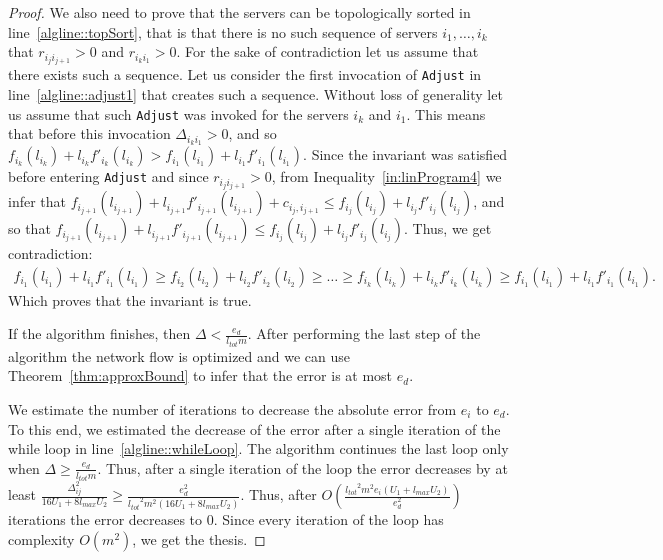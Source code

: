\documentclass[11pt]{article}
\newcommand{\ltot}{{{l_{\mathit{tot}}}}}
\newcommand{\lmax}{{{l_{\mathit{max}}}}}
\begin{document}
\begin{proof}
We also need to prove that the servers can be topologically sorted in line~\ref{algline::topSort}, that is that there is no such sequence of servers $i_1, \dots, i_k$ that $r_{i_{j}i_{j+1}} > 0$ and $r_{i_{k}i_{1}} > 0$. For the sake of contradiction let us assume that there exists such a sequence. Let us consider the first invocation of \texttt{Adjust} in line~\ref{algline::adjust1} that creates such a sequence. Without loss of generality let us assume that such \texttt{Adjust} was invoked for the servers $i_k$ and $i_1$. This means that before this invocation $\Delta_{i_ki_1} > 0$, and so
$f_{{i_k}}(l_{i_k}) + l_{i_k}f'_{{i_k}}(l_{i_k}) > f_{{i_1}}(l_{i_1}) + l_{i_1}f'_{{i_1}}(l_{i_1})$.
Since the invariant was satisfied before entering \texttt{Adjust} and since $r_{i_{j}i_{j+1}} > 0$, from Inequality~\ref{in:linProgram4} we infer that
$f_{{i_{j+1}}}(l_{i_{j+1}}) + l_{i_{j+1}}f'_{{i_{j+1}}}(l_{i_{j+1}}) + c_{i_{j},i_{j+1}} \leq f_{{i_{j}}}(l_{i_{j}}) + l_{i_{j}}f'_{{i_{j}}}(l_{i_{j}})$, and so that
$f_{{i_{j+1}}}(l_{i_{j+1}}) + l_{i_{j+1}}f'_{{i_{j+1}}}(l_{i_{j+1}}) \leq f_{{i_{j}}}(l_{i_{j}}) + l_{i_{j}}f'_{{i_{j}}}(l_{i_{j}})$. Thus, we get contradiction:
\begin{align*}
f_{{i_{1}}}(l_{i_{1}}) + l_{i_{1}}f'_{{i_{1}}}(l_{i_{1}}) \geq
f_{{i_{2}}}(l_{i_{2}}) + l_{i_{2}}f'_{{i_{2}}}(l_{i_{2}}) \geq
\dots \geq
f_{{i_{k}}}(l_{i_{k}}) + l_{i_{k}}f'_{{i_{k}}}(l_{i_{k}}) \geq
f_{{i_{1}}}(l_{i_{1}}) + l_{i_{1}}f'_{{i_{1}}}(l_{i_{1}}) \textrm{.}
\end{align*}
Which proves that the invariant is true.

If the algorithm finishes, then $\Delta < \frac{e_d}{\ltot m}$. After performing the last step of the algorithm the network flow is optimized and we can use Theorem~\ref{thm:approxBound} to infer that the error is at most $e_d$.

We estimate the number of iterations to decrease the absolute error from $e_i$ to $e_{d}$. To this end, we estimated the decrease of the error after a single iteration of the while loop in line~\ref{algline::whileLoop}.
The algorithm continues the last loop only when $\Delta \geq \frac{e_d}{\ltot m}$.
Thus, after a single iteration of the loop the error decreases by at least $\frac{\Delta_{ij}^2}{16U_1 + 8\lmax U_2} \geq \frac{e_d^2}{\ltot^2m^2(16U_1 + 8\lmax U_2)}$.
Thus, after $O(\frac{\ltot^2m^2e_i(U_1 + \lmax U_2)}{e_d^2})$ iterations the error decreases to 0. Since every iteration of the loop has complexity $O(m^2)$, we get the thesis.
\end{proof}
\end{document}
